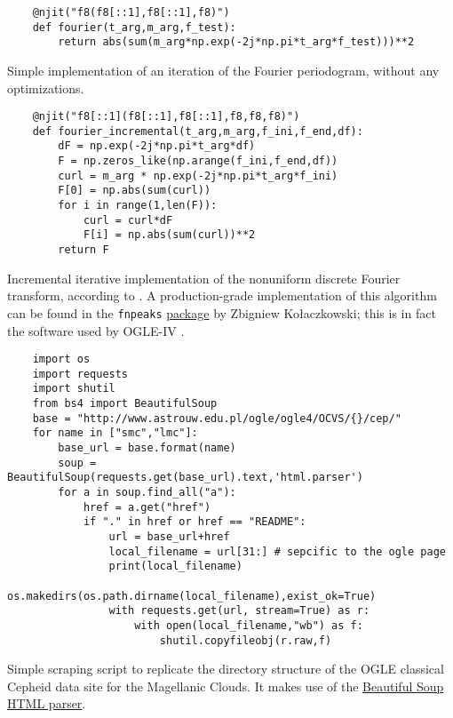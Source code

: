 \begin{listing}
	\begin{verbatim}
	@njit("f8(f8[::1],f8[::1],f8)")
	def fourier(t_arg,m_arg,f_test):
	    return abs(sum(m_arg*np.exp(-2j*np.pi*t_arg*f_test)))**2
	\end{verbatim}
	\caption[Naive implementation of the Fourier periodogram]{
		Simple implementation of an iteration of the Fourier periodogram, without any optimizations.
	}
	\label{lst:fourier-single}
\end{listing}

\begin{listing}
	\begin{verbatim}
	@njit("f8[::1](f8[::1],f8[::1],f8,f8,f8)")
	def fourier_incremental(t_arg,m_arg,f_ini,f_end,df):
	    dF = np.exp(-2j*np.pi*t_arg*df)
	    F = np.zeros_like(np.arange(f_ini,f_end,df))
	    curl = m_arg * np.exp(-2j*np.pi*t_arg*f_ini)
	    F[0] = np.abs(sum(curl))
	    for i in range(1,len(F)):
	        curl = curl*dF
	        F[i] = np.abs(sum(curl))**2
	    return F
	\end{verbatim}
	\caption[Incremental iterative implementation of the Fourier Periodogram]{
		Incremental iterative implementation of the nonuniform discrete Fourier transform, according to \cite{Kurtz1985}.
		A production-grade implementation of this algorithm can be found in the \texttt{fnpeaks} 
		\href{http://helas.astro.uni.wroc.pl/deliverables.php?lang=en&active=fnpeaks}{package} by Zbigniew Kołaczkowski;
		this is in fact the software used by OGLE-IV \citep{OGLE2016}.
	}
	\label{lst:fourier}
\end{listing}



\begin{listing}
	\begin{verbatim}
	import os
	import requests
	import shutil
	from bs4 import BeautifulSoup
	base = "http://www.astrouw.edu.pl/ogle/ogle4/OCVS/{}/cep/"
	for name in ["smc","lmc"]:
	    base_url = base.format(name)
	    soup = BeautifulSoup(requests.get(base_url).text,'html.parser')
	    for a in soup.find_all("a"):
	        href = a.get("href")
	        if "." in href or href == "README":
	            url = base_url+href
	            local_filename = url[31:] # sepcific to the ogle page
	            print(local_filename)
	            os.makedirs(os.path.dirname(local_filename),exist_ok=True)
	            with requests.get(url, stream=True) as r:
	                with open(local_filename,"wb") as f:
	                    shutil.copyfileobj(r.raw,f)
	\end{verbatim}
	\caption[OGLE data download script]{
		Simple scraping script to replicate the directory structure of the OGLE classical Cepheid data site for the Magellanic Clouds.
		It makes use of the \href{https://www.crummy.com/software/BeautifulSoup/}{Beautiful Soup HTML parser}.
	}
	\label{lst:download}
\end{listing}



